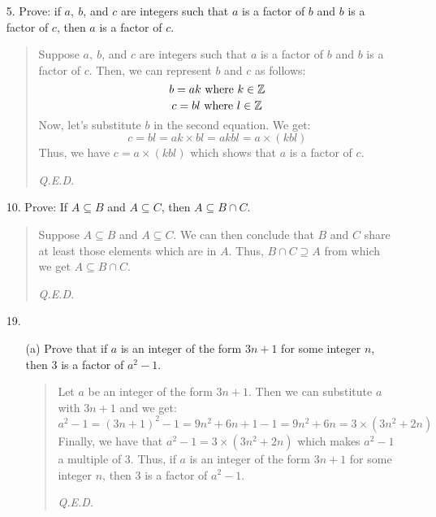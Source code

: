 \documentclass[12pt, a4paper]{article}                      %
\begin{document}
\begin{enumerate}
\item[5.]
Prove: if $a, \ b$, and $c$ are integers such that $a$ is a factor of $b$ and $b$ is a factor of $c$,
then $a$ is a factor of $c$.
\begin{quote}
Suppose $a, \ b$, and $c$ are integers such that $a$ is a factor of $b$ and $b$ is a factor of $c$.
Then, we can represent $b$ and $c$ as follows:
$$
b = ak \ \textnormal{where} \ k \in \mathbb{Z}
$$
$$
c = bl \ \textnormal{where} \ l \in \mathbb{Z}
$$
Now, let's substitute $b$ in the second equation. We get:
$$
c = bl = ak \times bl = akbl = a \times (kbl)
$$
Thus, we have $c = a \times (kbl)$ which shows that $a$ is a factor of $c$.
\begin{flushright}
\textit{Q.E.D.}
\end{flushright}
\end{quote}

\item[10.]
Prove: If $A \subseteq B$ and $A \subseteq C$, then $A \subseteq B \cap C$.
\begin{quote}
Suppose $A \subseteq B$ and $A \subseteq C$. We can then conclude that $B$ and $C$ share
at least those elements which are in $A$. Thus, $B \cap C \supseteq A$ from which we get
$A \subseteq B \cap C$.
\begin{flushright}
\textit{Q.E.D.}
\end{flushright}
\end{quote}

\item[19.]

\begin{itemize}
\item[(a)]
Prove that if $a$ is an integer of the form $3n + 1$ for some integer $n$, then 3 is a factor
of $a^2 - 1$.
\begin{quote}
Let $a$ be an integer of the form $3n + 1$. Then we can substitute $a$ with $3n + 1$ and we get:
$$
a^2 - 1 = (3n + 1)^2 - 1 = 9n^2 + 6n + 1 - 1 = 9n^2 + 6n = 3 \times (3n^2 + 2n)
$$
Finally, we have that $a^2 - 1 = 3 \times (3n^2 + 2n)$ which makes $a^2 - 1$ a multiple of 3.
Thus, if $a$ is an integer of the form $3n + 1$ for some integer $n$, then 3 is a factor
of $a^2 - 1$.
\begin{flushright}
\textit{Q.E.D.}
\end{flushright}
\end{quote}
\end{itemize}
\end{enumerate}
\end{document}
